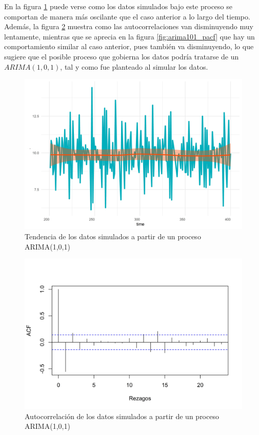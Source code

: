\documentclass[
]{article}
\begin{document}
En la figura \ref{fig:arima101_comportamiento} puede verse como los
datos simulados bajo este proceso se comportan de manera más oscilante
que el caso anterior a lo largo del tiempo. Además, la figura
\ref{fig:arima101_acf} muestra como las autocorrelaciones van
disminuyendo muy lentamente, mientras que se aprecia en la figura
\ref{fig:arima101_pacf} que hay un comportamiento similar al caso
anterior, pues también va disminuyendo, lo que sugiere que el posible
proceso que gobierna los datos podría tratarse de un \(ARIMA(1,0,1)\),
tal y como fue planteado al simular los datos.

\begin{figure}[H]
\includegraphics[width=1\linewidth,height=1\textheight]{Tesis_files/figure-latex/arima101_comportamiento-1} \caption{Tendencia de los datos simulados a partir de un proceso ARIMA(1,0,1)}\label{fig:arima101_comportamiento}
\end{figure}

\begin{figure}[H]
\includegraphics[width=1\linewidth,height=1\textheight]{Tesis_files/figure-latex/arima101_acf-1} \caption{Autocorrelación de los datos simulados a partir de un proceso ARIMA(1,0,1)}\label{fig:arima101_acf}
\end{figure}
\end{document}
